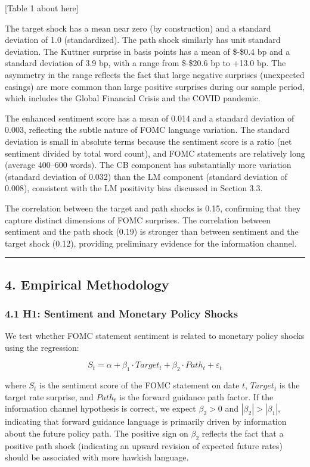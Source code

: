 \documentclass[12pt]{article}
\begin{document}
{[}Table 1 about here{]}

The target shock has a mean near zero (by construction) and a standard
deviation of 1.0 (standardized). The path shock similarly has unit
standard deviation. The Kuttner surprise in basis points has a mean of
\$-\$0.4 bp and a standard deviation of 3.9 bp, with a range from
\$-\$20.6 bp to +13.0 bp. The asymmetry in the range reflects the fact
that large negative surprises (unexpected easings) are more common than
large positive surprises during our sample period, which includes the
Global Financial Crisis and the COVID pandemic.

The enhanced sentiment score has a mean of 0.014 and a standard
deviation of 0.003, reflecting the subtle nature of FOMC language
variation. The standard deviation is small in absolute terms because the
sentiment score is a ratio (net sentiment divided by total word count),
and FOMC statements are relatively long (average 400--600 words). The CB
component has substantially more variation (standard deviation of 0.032)
than the LM component (standard deviation of 0.008), consistent with the
LM positivity bias discussed in Section 3.3.

The correlation between the target and path shocks is 0.15, confirming
that they capture distinct dimensions of FOMC surprises. The correlation
between sentiment and the path shock (0.19) is stronger than between
sentiment and the target shock (0.12), providing preliminary evidence
for the information channel.

\begin{center}\rule{0.5\linewidth}{0.5pt}\end{center}

\subsection{4. Empirical Methodology}\label{empirical-methodology}

\subsubsection{4.1 H1: Sentiment and Monetary Policy
Shocks}\label{h1-sentiment-and-monetary-policy-shocks}

We test whether FOMC statement sentiment is related to monetary policy
shocks using the regression:

\[S_t = \alpha + \beta_1 \cdot Target_t + \beta_2 \cdot Path_t + \varepsilon_t\]

where \(S_t\) is the sentiment score of the FOMC statement on date
\(t\), \(Target_t\) is the target rate surprise, and \(Path_t\) is the
forward guidance path factor. If the information channel hypothesis is
correct, we expect \(\beta_2 > 0\) and \(|\beta_2| > |\beta_1|\),
indicating that forward guidance language is primarily driven by
information about the future policy path. The positive sign on
\(\beta_2\) reflects the fact that a positive path shock (indicating an
upward revision of expected future rates) should be associated with more
hawkish language.
\end{document}
